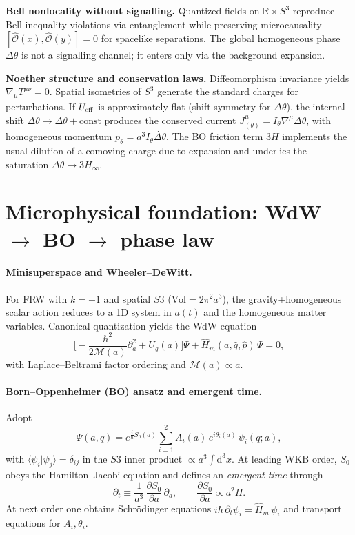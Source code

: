 \documentclass[twocolumn,aps,prd,showpacs,nofootinbib,superscriptaddress]{revtex4-2}
\def\Sthree{S3}%
\newcommand{\Sthree}{S^{3}}
\newcommand{\dd}{\mathrm{d}}
\begin{document}
\noindent\textbf{Bell nonlocality without signalling.}
Quantized fields on $\mathbb{R}\times S^3$ reproduce Bell-inequality violations via entanglement while preserving microcausality $[\hat{\mathcal O}(x),\hat{\mathcal O}(y)]=0$ for spacelike separations. The global homogeneous phase $\Delta\theta$ is not a signalling channel; it enters only via the background expansion.

\noindent\textbf{Noether structure and conservation laws.}
Diffeomorphism invariance yields $\nabla_\mu T^{\mu\nu}=0$. Spatial isometries of $S^3$ generate the standard charges for perturbations. If $U_{\rm eff}$ is approximately flat (shift symmetry for $\Delta\theta$), the internal shift $\Delta\theta\!\to\!\Delta\theta+\text{const}$ produces the conserved current $J^\mu_{\!(\theta)}=I_\theta\nabla^\mu \Delta\theta$, with homogeneous momentum $p_\theta=a^3 I_\theta\dot{\Delta\theta}$. The BO friction term $3H$ implements the usual dilution of a comoving charge due to expansion and underlies the saturation $\dot{\Delta\theta}\!\to\!3H_\infty$.

\section{Microphysical foundation: WdW $\to$ BO $\to$ phase law}
\label{sec:micro}
\paragraph*{Minisuperspace and Wheeler--DeWitt.}
For FRW with $k{=}+1$ and spatial $\Sthree$ ($\text{Vol}=2\pi^2 a^3$), the gravity+homogeneous scalar action reduces to a 1D system in $a(t)$ and the homogeneous matter variables. Canonical quantization yields the WdW equation
\begin{equation}
\Big[-\frac{\hbar^2}{2\mathcal{M}(a)}\partial_a^2+U_g(a)\Big]\Psi
+\hat{H}_m(a,\hat{q},\hat{p})\,\Psi=0,
\end{equation}
with Laplace--Beltrami factor ordering and $\mathcal{M}(a)\propto a$.

\paragraph*{Born--Oppenheimer (BO) ansatz and emergent time.}
Adopt
\begin{equation}
\Psi(a,q)=e^{\tfrac{i}{\hbar}S_0(a)}\sum_{i=1}^2 A_i(a)\,e^{i\theta_i(a)}\,\psi_i(q;a),
\end{equation}
with $\langle\psi_i|\psi_j\rangle=\delta_{ij}$ in the $\Sthree$ inner product $\propto a^3\!\int \dd^3x$. At leading WKB order, $S_0$ obeys the Hamilton--Jacobi equation
and defines an \emph{emergent time} through
\begin{equation}
\partial_t \equiv \frac{1}{a^3}\,\frac{\partial S_0}{\partial a}\,\partial_a,
\qquad
\frac{\partial S_0}{\partial a}\propto a^2 H.
\end{equation}
At next order one obtains Schrödinger equations $i\hbar\,\partial_t \psi_i=\hat{H}_m\,\psi_i$ and transport equations for $A_i,\theta_i$.
\end{document}

